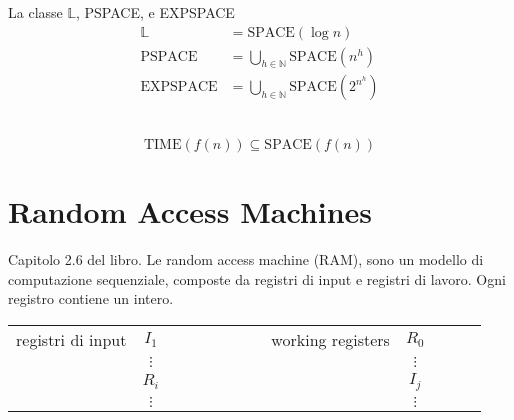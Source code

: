 La classe $\mathbb{L}$, PSPACE, e EXPSPACE
\begin{align*}
    \mathbb{L} &= \text{SPACE}(\log n)\\
    \text{PSPACE} &= \bigcup_{h\in\mathbb{N}} \text{SPACE}(n^h)\\
    \text{EXPSPACE} &= \bigcup_{h\in\mathbb{N}} \text{SPACE}(2^{n^h}) 
\end{align*}

\begin{property}~
    $$
        \text{TIME}(f(n)) \subseteq \text{SPACE}(f(n))
    $$    
\end{property}

\section{Random Access Machines}
Capitolo 2.6 del libro. Le random access machine (RAM), sono un modello di computazione sequenziale, composte da registri di input e registri di lavoro. Ogni registro contiene un intero.
\begin{table}[H]
    \centering
    \def\arraystretch{1.5}
    \begin{tabular}{lc|c|clc|c|}
        \cline{3-3} \cline{7-7}
        registri di input & $I_1$    & $\qquad$ & $\qquad$ & working registers & $R_0$    & $\qquad$ \\ \cline{3-3} \cline{7-7} 
                          & $\vdots$ &          &          &                   & $\vdots$ &          \\ \cline{3-3} \cline{7-7} 
                          & $R_i$    &          &          &                   & $I_j$    &          \\ \cline{3-3} \cline{7-7} 
                          & $\vdots$ &          &          &                   & $\vdots$ &         
    \end{tabular}
\end{table}

